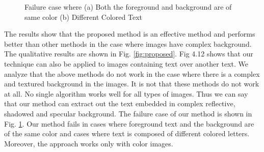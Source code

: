 \begin{figure}[t]
{}
\caption
{Failure case where (a) Both the foreground and background are
of same color (b) Different Colored Text}
\label{fig:failure}
\end{figure}

The results show that the proposed method is an effective method and performs better than other methods 
in the case where images have
complex background. The qualitative results are shown in Fig. \ref{fig:proposed}. Fig 4.12 shows that our 
technique can
also be applied to images containing text over another text. 
We analyze that the above methods do not work in the case where there is a complex and textured background in the images.
It is not that these methods do not work at all. No single algorithm works well for all types of images. Thus we can say
that our method can extract out the text embedded in complex reflective, shadowed and
specular background.
The failure case of our method is shown in Fig. \ref{fig:failure}.
Our method fails in cases where foreground text and the background are of the same color
and cases where text is composed of different colored letters.
Moreover, the approach works only with color images.

